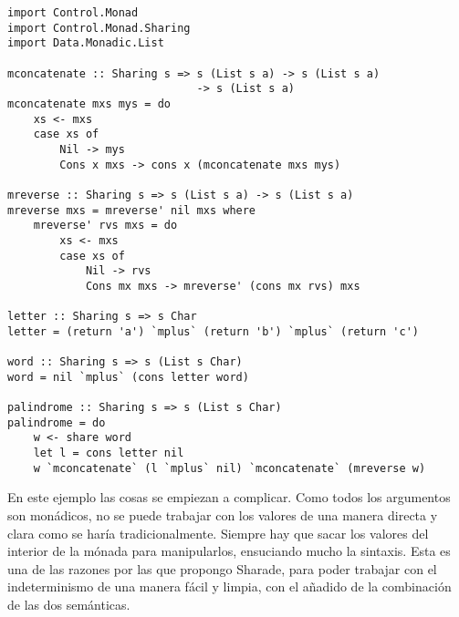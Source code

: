 \documentclass[class=article, crop=false]{standalone}
\begin{document}
\begin{verbatim}
import Control.Monad
import Control.Monad.Sharing
import Data.Monadic.List

mconcatenate :: Sharing s => s (List s a) -> s (List s a)
                             -> s (List s a)
mconcatenate mxs mys = do
    xs <- mxs
    case xs of
        Nil -> mys
        Cons x mxs -> cons x (mconcatenate mxs mys)

mreverse :: Sharing s => s (List s a) -> s (List s a)
mreverse mxs = mreverse' nil mxs where
    mreverse' rvs mxs = do
        xs <- mxs
        case xs of
            Nil -> rvs
            Cons mx mxs -> mreverse' (cons mx rvs) mxs

letter :: Sharing s => s Char
letter = (return 'a') `mplus` (return 'b') `mplus` (return 'c')

word :: Sharing s => s (List s Char)
word = nil `mplus` (cons letter word)

palindrome :: Sharing s => s (List s Char)
palindrome = do
    w <- share word
    let l = cons letter nil
    w `mconcatenate` (l `mplus` nil) `mconcatenate` (mreverse w)
\end{verbatim}

En este ejemplo las cosas se empiezan a complicar. Como todos los argumentos son monádicos,
no se puede trabajar con los valores de una manera directa y clara como se haría
tradicionalmente. Siempre hay que sacar los valores del interior de la mónada para
manipularlos, ensuciando mucho la sintaxis. Esta es una de las razones por las que propongo
Sharade, para poder trabajar con el indeterminismo de una manera fácil y limpia, con el
añadido de la combinación de las dos semánticas.
\end{document}

